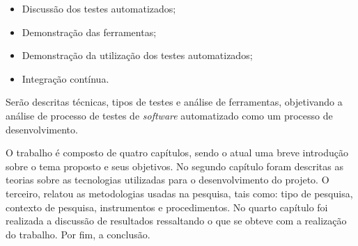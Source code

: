 \begin{itemize}
    \item Discussão dos testes automatizados;
    \item Demonstração das ferramentas;
    \item Demonstração da utilização dos testes automatizados;
    \item Integração contínua.
\end{itemize}

\par Serão descritas técnicas, tipos de testes e análise de ferramentas, objetivando a análise de processo de testes de \textit{software} automatizado como um processo de desenvolvimento.

\par O trabalho é composto de quatro capítulos, sendo o atual uma breve introdução sobre o tema proposto e seus objetivos. No segundo capítulo foram descritas as teorias sobre as tecnologias utilizadas para o desenvolvimento do projeto. O terceiro, relatou as metodologias usadas na pesquisa, tais como: tipo de pesquisa, contexto de pesquisa, instrumentos e procedimentos.
No quarto capítulo foi realizada a discussão de resultados ressaltando o que se obteve com a realização do trabalho. Por fim, a conclusão.